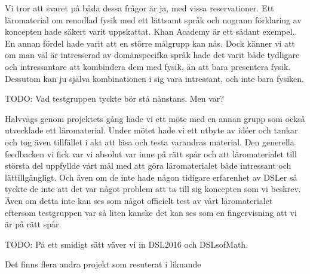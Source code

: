 \begin{binge}
Vi tror att svaret på båda dessa frågor är ja, med vissa reservationer. Ett läromaterial om renodlad fysik med ett lättsamt språk och nogrann förklaring av koncepten hade säkert varit uppskattat. Khan Academy är ett sådant exempel.\cite{khan}. En annan fördel hade varit att en större målgrupp kan nås. Dock känner vi att om man väl är intresserad av domänspecifka språk hade det varit både tydligare och intressantare att kombindera dem med fysik, än att bara presentera fysik. Dessutom kan ju själva kombinationen i sig vara intressant, och inte bara fysiken.

TODO: Vad testgruppen tyckte bör stå nånstans. Men var?

Halvvägs genom projektets gång hade vi ett möte med en annan grupp som också utvecklade ett läromaterial. Under mötet hade vi ett utbyte av idéer och tankar och tog även tillfället i akt att läsa och testa varandras material. Den generella feedbacken vi fick var vi absolut var inne på rätt spår och att läromaterialet till största del uppfyllde vårt mål med att göra läromaterialet både intressant och lättillgängligt. Och även om de inte hade någon tidigare erfarenhet av DSLer så tyckte de inte att det var något problem att ta till sig koncepten som vi beskrev. Även om detta inte kan ses som något officielt test av vårt läromaterialet eftersom testgruppen var så liten kanske det kan ses som en fingervisning att vi är på rätt spår.

TODO: På ett smidigt sätt väver vi in DSL2016 och DSLsofMath.

Det finns flera andra projekt som resuterat i liknande 

\end{binge}































